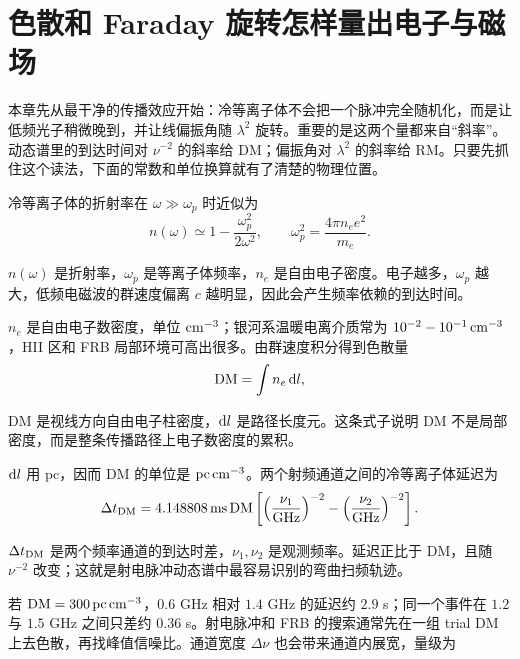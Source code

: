 \section{色散和 Faraday 旋转怎样量出电子与磁场}

本章先从最干净的传播效应开始：冷等离子体不会把一个脉冲完全随机化，而是让低频光子稍微晚到，并让线偏振角随 \(\lambda^2\) 旋转。重要的是这两个量都来自“斜率”。动态谱里的到达时间对 \(\nu^{-2}\) 的斜率给 DM；偏振角对 \(\lambda^2\) 的斜率给 RM。只要先抓住这个读法，下面的常数和单位换算就有了清楚的物理位置。

冷等离子体的折射率在 \(\omega\gg\omega_p\) 时近似为
\begin{equation}
  n(\omega)\simeq 1-\frac{\omega_p^2}{2\omega^2},
  \qquad
  \omega_p^2=\frac{4\pi n_e e^2}{m_e}.
  \label{eq:ch14-plasma-index}
\end{equation}
\begin{formulaexplain}[公式 (14.3) 解读]
\(n(\omega)\) 是折射率，\(\omega_p\) 是等离子体频率，\(n_e\) 是自由电子密度。电子越多，\(\omega_p\) 越大，低频电磁波的群速度偏离 \(c\) 越明显，因此会产生频率依赖的到达时间。
\end{formulaexplain}
\(n_e\) 是自由电子数密度，单位 \({\rm cm^{-3}}\)；银河系温暖电离介质常为 \(10^{-2}-10^{-1}\,{\rm cm^{-3}}\)，HII 区和 FRB 局部环境可高出很多。由群速度积分得到色散量
\begin{equation}
  {\rm DM}=\int n_e\,{\rm d}l ,
  \label{eq:ch14-dm-definition}
\end{equation}
\begin{formulaexplain}[公式 (14.4) 解读]
DM 是视线方向自由电子柱密度，\({\rm d}l\) 是路径长度元。这条式子说明 DM 不是局部密度，而是整条传播路径上电子数密度的累积。
\end{formulaexplain}
\({\rm d}l\) 用 pc，因而 DM 的单位是 \({\rm pc\,cm^{-3}}\)。两个射频通道之间的冷等离子体延迟为
\begin{equation}
  \Delta t_{\rm DM}
  =
  4.148808\,{\rm ms}\,
  {\rm DM}
  \left[
  \left(\frac{\nu_1}{\rm GHz}\right)^{-2}
  -
  \left(\frac{\nu_2}{\rm GHz}\right)^{-2}
  \right].
  \label{eq:ch14-dispersion-delay}
\end{equation}
\begin{formulaexplain}[公式 (14.5) 解读]
\(\Delta t_{\rm DM}\) 是两个频率通道的到达时差，\(\nu_1,\nu_2\) 是观测频率。延迟正比于 DM，且随 \(\nu^{-2}\) 改变；这就是射电脉冲动态谱中最容易识别的弯曲扫频轨迹。
\end{formulaexplain}
若 \({\rm DM}=300\,{\rm pc\,cm^{-3}}\)，\(0.6\) GHz 相对 \(1.4\) GHz 的延迟约 \(2.9\) s；同一个事件在 \(1.2\) 与 \(1.5\) GHz 之间只差约 \(0.36\) s。射电脉冲和 FRB 的搜索通常先在一组 trial DM 上去色散，再找峰值信噪比。通道宽度 \(\Delta\nu\) 也会带来通道内展宽，量级为
